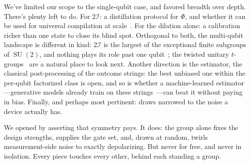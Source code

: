 \documentclass[11pt, oneside, openany]{scrbook}
\DeclareMathOperator{\SU}{SU}
\newcommand{\Id}{\mathbbm{1}}
\newcommand{\Igroup}{\mathcal{I}}  %
\newcommand{\TwoI}{2\Igroup}
\begin{document}
We've limited our scope to the single-qubit case, and favored breadth over depth. There's plenty left to do. For $\TwoI$: a distillation protocol for $\Phi$, and whether it can be used for universal compilation at scale~\cite{blackman2022fastnavigationicosahedral}. For the dilation alone: a calibration richer than one state to close its blind spot. Orthogonal to both, the multi-qubit landscape is different in kind: $\TwoI$ is the largest of the exceptional finite subgroups of $\SU(2)$, and nothing plays its role past one qubit~\cite[Cor.~2]{bannai2018unitarytgroups}; the twisted unitary $t$-groups~\cite{kubischta2024quantumcodestwisted} are a natural place to look next. Another direction is the estimator, the classical post-processing of the outcome strings: the best unbiased one within the per-qubit factorized class is open, and so is whether a machine-learned estimator---generative models already train on these strings~\cite{carrasquilla2019reconstructingquantumstates}---can beat it without paying in bias. Finally, and perhaps most pertinent: draws narrowed to the noise a device actually has.

We opened by asserting that symmetry pays. It does: the group alone fixes the design strengths, supplies the gate set, and, drawn at random, twirls measurement-side noise to exactly depolarizing. But never for free, and never in isolation. Every piece touches every other, behind each standing a group.

\printbibliography[heading=bibintoc]
\end{document}
